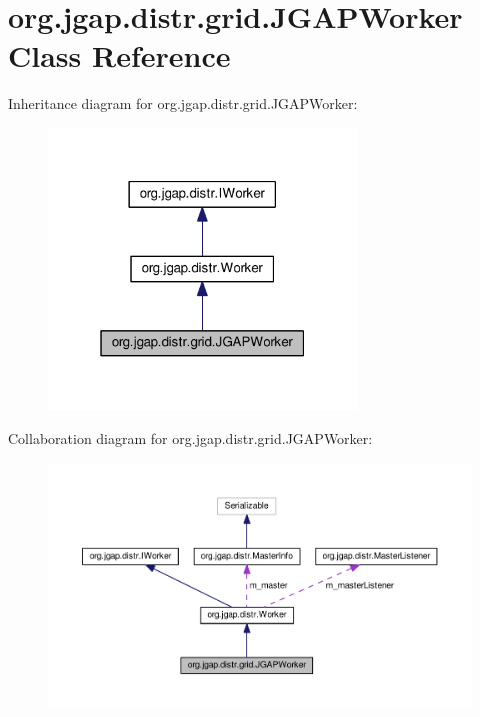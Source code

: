 \hypertarget{classorg_1_1jgap_1_1distr_1_1grid_1_1_j_g_a_p_worker}{\section{org.\-jgap.\-distr.\-grid.\-J\-G\-A\-P\-Worker Class Reference}
\label{classorg_1_1jgap_1_1distr_1_1grid_1_1_j_g_a_p_worker}
}


Inheritance diagram for org.\-jgap.\-distr.\-grid.\-J\-G\-A\-P\-Worker\-:
\nopagebreak
\begin{figure}[H]
\begin{center}
\leavevmode
\includegraphics[width=232pt]{classorg_1_1jgap_1_1distr_1_1grid_1_1_j_g_a_p_worker__inherit__graph}
\end{center}
\end{figure}


Collaboration diagram for org.\-jgap.\-distr.\-grid.\-J\-G\-A\-P\-Worker\-:
\nopagebreak
\begin{figure}[H]
\begin{center}
\leavevmode
\includegraphics[width=350pt]{classorg_1_1jgap_1_1distr_1_1grid_1_1_j_g_a_p_worker__coll__graph}
\end{center}
\end{figure}
